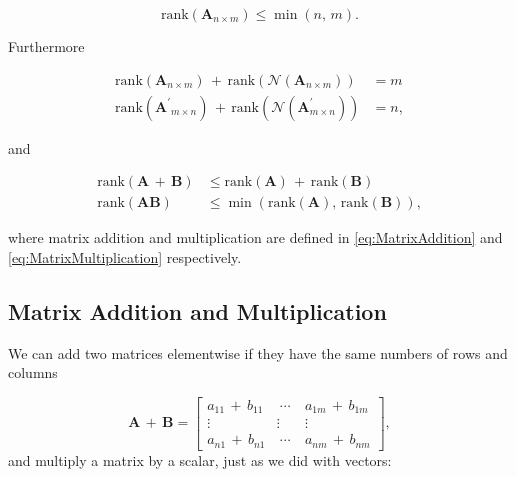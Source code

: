 \documentclass[graybox,envcountchap,sectrefs]{svmono}\usepackage[]{graphicx}\usepackage[]{xcolor}
\begin{document}
\begin{appendices}
\begin{equation}
\mathrm{rank}\left(\mathrm{\mathbf{A}}_{n\times m}\right)\leqslant\min\left(n,\,m\right).\label{eq:MatrixRank}
\end{equation}

Furthermore

\begin{subequations}
\begin{align}
\mathrm{rank}\left(\mathrm{\mathbf{A}}_{n\times m}\right)\,+\,\mathrm{rank}\left(\mathcal{{N}}\left(\mathrm{\mathbf{A}}_{n\times m}\right)\right) & =m\label{eq:SumOfRanksA}\\
\mathrm{rank}\left(\mathrm{\mathbf{A}^{\prime}}_{m\times n}\right)\,+\,\mathrm{rank}\left(\mathcal{{N}}\left(\mathrm{\mathbf{A}}_{m\times n}^{\prime}\right)\right) & =n,\label{eq:SumOfRanksB}
\end{align}
\end{subequations}

and 

\begin{subequations}
\begin{align}
\mathrm{rank}\left(\mathrm{\mathbf{A}}\,+\,\mathbf{B}\right) & \leqslant\mathrm{rank}\left(\mathrm{\mathbf{A}}\right)\,+\,\mathrm{rank}\left(\mathbf{B}\right)\label{eq:RankOfSums}\\
\mathrm{rank}\left(\mathrm{\mathbf{A}}\mathbf{B}\right) & \leqslant\min\left(\mathrm{rank}\left(\mathrm{\mathbf{A}}\right),\,\mathrm{rank}\left(\mathbf{B}\right)\right),\label{eq:RankOfProduct}
\end{align}
\end{subequations}

where matrix addition and multiplication are defined in \eqref{eq:MatrixAddition}
and \eqref{eq:MatrixMultiplication} respectively.


\subsection{Matrix Addition and Multiplication}

We can add two matrices elementwise if they have the same numbers
of rows and columns

\begin{equation}
\mathrm{\mathbf{A}}\,+\,\mathrm{\mathbf{B}}=\left[\begin{array}{ccc}
a_{11}\,+\,b_{11} & \ \cdots\  & a_{1m}\,+\,b_{1m}\\
\vdots & \vdots & \vdots\\
a_{n1}\,+\,b_{n1} & \ \cdots\  & a_{nm}\,+\,b_{nm}
\end{array}\right],\label{eq:MatrixAddition}
\end{equation}
and multiply a matrix by a scalar, just as we did with vectors:


\end{appendices}
\end{document}
